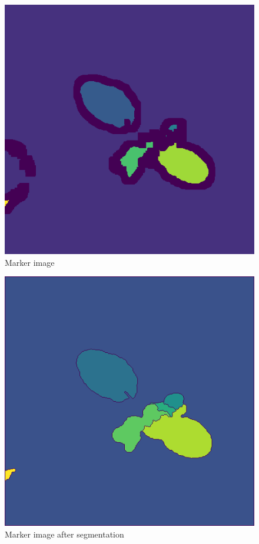 \documentclass[10pt]{article}
\begin{document}
\begin{figure}[H]
\caption{Marker image}
\includegraphics[width=\textwidth]{../example/markers}
\end{figure}
\begin{figure}[H]
\caption{Marker image after segmentation}
\includegraphics[width=\textwidth]{../example/segmented}
\end{figure}
\end{document}
